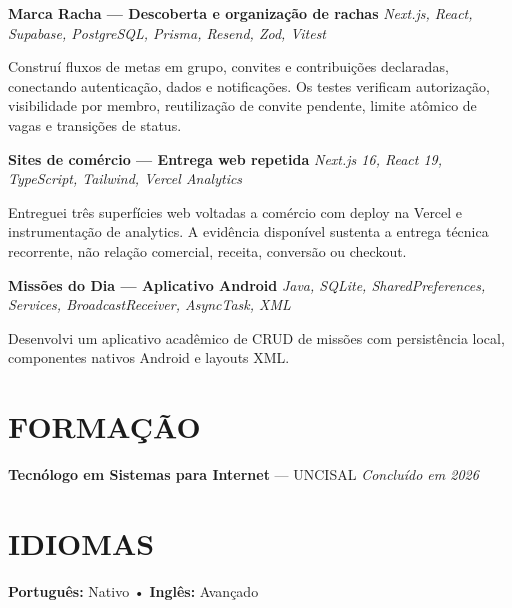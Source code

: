 \documentclass[10pt,a4paper]{article}
\begin{document}
\vspace{0.5pt}

\noindent
\textbf{Marca Racha — Descoberta e organização de rachas}
\hfill
\textit{Next.js, React, Supabase, PostgreSQL, Prisma, Resend, Zod, Vitest}

\footnotesize

Construí fluxos de metas em grupo, convites e contribuições declaradas, conectando autenticação, dados e notificações. Os testes verificam autorização, visibilidade por membro, reutilização de convite pendente, limite atômico de vagas e transições de status.

\vspace{0.5pt}

\noindent
\textbf{Sites de comércio — Entrega web repetida}
\hfill
\textit{Next.js 16, React 19, TypeScript, Tailwind, Vercel Analytics}

\footnotesize

Entreguei três superfícies web voltadas a comércio com deploy na Vercel e instrumentação de analytics. A evidência disponível sustenta a entrega técnica recorrente, não relação comercial, receita, conversão ou checkout.

\vspace{0.5pt}

\noindent
\textbf{Missões do Dia — Aplicativo Android}
\hfill
\textit{Java, SQLite, SharedPreferences, Services, BroadcastReceiver, AsyncTask, XML}

\footnotesize

Desenvolvi um aplicativo acadêmico de CRUD de missões com persistência local, componentes nativos Android e layouts XML.

\section*{FORMAÇÃO}

\noindent
\textbf{Tecnólogo em Sistemas para Internet} — UNCISAL
\hfill
\textit{Concluído em 2026}


\section*{IDIOMAS}

\noindent
\textbf{Português:} Nativo
\quad • \quad
\textbf{Inglês:} Avançado 
\end{document}
